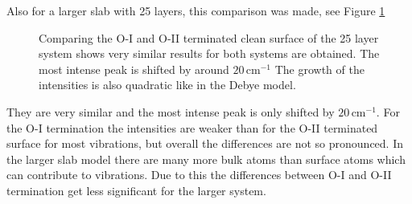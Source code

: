 \documentclass[11pt,DIV=13,BCOR=5mm,a4paper,headinclude]{scrbook}
\newcommand\todo[1]{\textcolor{red}{TODO: \textit{{#1}}}}
\begin{document}
Also for a larger slab with 25 layers, this comparison was made, see Figure \ref{abb:comp_O-I-O-II_25}
\begin{figure}[!h]
 \centering
 \caption{Comparing the O-I and O-II terminated clean surface of the 25 layer system shows very similar results for both systems are obtained.
The most intense peak is shifted by around $20\,$cm$^{-1}$
The growth of the intensities is also quadratic like in the Debye model.}
 \label{abb:comp_O-I-O-II_25}
\end{figure}
They are very similar and the most intense peak is only shifted by $20\,$cm$^{-1}$.
For the O-I termination the intensities are weaker than for the O-II terminated surface for most vibrations, but overall the differences are not so pronounced.
In the larger slab model there are many more bulk atoms than surface atoms which can contribute to vibrations.
Due to this the differences between O-I and O-II termination get less significant for the larger system.
\end{document}
